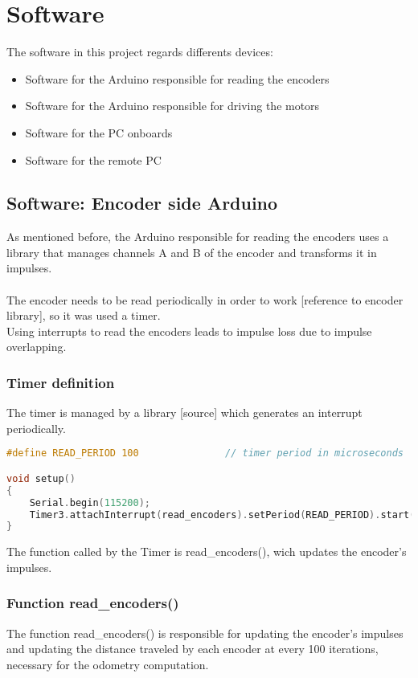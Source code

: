 \chapter{Software}
The software in this project regards differents devices:
\begin{itemize}
    \item Software for the Arduino responsible for reading the encoders
    \item Software for the Arduino responsible for driving the motors
    \item Software for the PC onboards
    \item Software for the remote PC 
\end{itemize}

\section{Software: Encoder side Arduino}
As mentioned before, the Arduino responsible for reading the encoders uses a library that manages channels A and B of the encoder and transforms it in impulses. 
\\ \\
The encoder needs to be read periodically in order to work [reference to encoder library], so it was used a timer. 
\\
Using interrupts to read the encoders leads to impulse loss due to impulse overlapping. 
\\

\subsection{Timer definition}
The timer is managed by a library [source] which generates an interrupt periodically.

\begin{lstlisting}[language=C]
#define READ_PERIOD 100               // timer period in microseconds

void setup()
{
    Serial.begin(115200);
    Timer3.attachInterrupt(read_encoders).setPeriod(READ_PERIOD).start();
}
\end{lstlisting}

The function called by the Timer is read\_encoders(), wich updates the encoder's impulses.

\subsection{Function read\_encoders()}
The function read\_encoders() is responsible for updating the encoder's impulses and updating the distance traveled by each encoder at every 100 iterations, necessary for the odometry computation.

